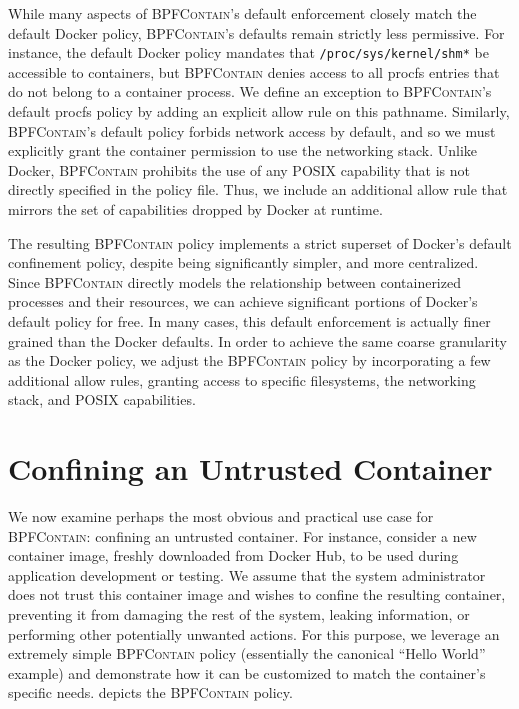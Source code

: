 \documentclass[
  fontsize=12pt,
  titlepage=firstiscover,
  paper=letter,
oneside,
  cleardoublepage=plain,
  parskip=half-,
  DIV=10,
  parindent,
  appendixprefix,
  chapterprefix,
  listof=totoc,
]{scrbook}
\newcommand{\bpfcontain}{\textsc{BPFContain}}
\begin{document}
While many aspects of \bpfcontain{}'s default enforcement closely match the default Docker
policy, \bpfcontain{}'s defaults remain strictly less permissive. For instance, the
default Docker policy mandates that \texttt{/proc/sys/kernel/shm*} be accessible to
containers, but \bpfcontain{} denies access to all procfs entries that do not belong to
a container process. We define an exception to \bpfcontain{}'s default procfs policy by
adding an explicit allow rule on this pathname. Similarly, \bpfcontain{}'s default policy
forbids network access by default, and so we must explicitly grant the container
permission to use the networking stack. Unlike Docker, \bpfcontain{} prohibits the use of
any POSIX capability that is not directly specified in the policy file. Thus, we include
an additional allow rule that mirrors the set of capabilities dropped by Docker at
runtime.

The resulting \bpfcontain{} policy implements a strict superset of Docker's default
confinement policy, despite being significantly simpler, and more centralized.  Since
\bpfcontain{} directly models the relationship between containerized processes and their
resources, we can achieve significant portions of Docker's default policy for free. In
many cases, this default enforcement is actually finer grained than the Docker defaults.
In order to achieve the same coarse granularity as the Docker policy, we adjust the
\bpfcontain{} policy by incorporating a few additional allow rules, granting access to
specific filesystems, the networking stack, and POSIX capabilities.

\section{Confining an Untrusted Container}

We now examine perhaps the most obvious and practical use case for \bpfcontain{}:
confining an untrusted container. For instance, consider a new container image, freshly
downloaded from Docker Hub, to be used during application development or testing.  We
assume that the system administrator does not trust this container image and wishes to
confine the resulting container, preventing it from damaging the rest of the system,
leaking information, or performing other potentially unwanted actions. For this purpose,
we leverage an extremely simple \bpfcontain{} policy (essentially the canonical
\enquote{Hello World} example) and demonstrate how it can be customized to match the
container's specific needs.  depicts the \bpfcontain{} policy.
\end{document}
